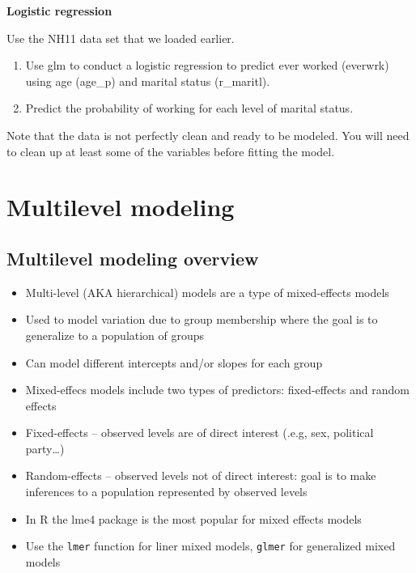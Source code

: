 \documentclass[]{book}
\providecommand{\tightlist}{%
  \setlength{\itemsep}{0pt}\setlength{\parskip}{0pt}}
\begin{document}
\textbf{Logistic regression}

Use the NH11 data set that we loaded earlier.

\begin{enumerate}
\def\labelenumi{\arabic{enumi}.}
\tightlist
\item
  Use glm to conduct a logistic regression to predict ever worked
  (everwrk) using age (age\_p) and marital status (r\_maritl).
\item
  Predict the probability of working for each level of marital status.
\end{enumerate}

Note that the data is not perfectly clean and ready to be modeled. You
will need to clean up at least some of the variables before fitting the
model.

\section{Multilevel modeling}\label{multilevel-modeling}

\subsection{Multilevel modeling
overview}\label{multilevel-modeling-overview}

\begin{itemize}
\tightlist
\item
  Multi-level (AKA hierarchical) models are a type of mixed-effects
  models
\item
  Used to model variation due to group membership where the goal is to
  generalize to a population of groups
\item
  Can model different intercepts and/or slopes for each group
\item
  Mixed-effecs models include two types of predictors: fixed-effects and
  random effects
\item
  Fixed-effects -- observed levels are of direct interest (.e.g, sex,
  political party\ldots{})
\item
  Random-effects -- observed levels not of direct interest: goal is to
  make inferences to a population represented by observed levels
\item
  In R the lme4 package is the most popular for mixed effects models
\item
  Use the \texttt{lmer} function for liner mixed models, \texttt{glmer}
  for generalized mixed models
\end{itemize}
\end{document}

